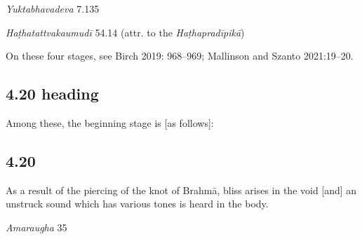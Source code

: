 \begin{ekdosis}
\begin{testimonia}[hp04_019]
\emph{Yuktabhavadeva} 7.135
\begin{versinnote}
\end{versinnote}

\emph{Haṭhatattvakaumudī} 54.14 (attr. to the \emph{Haṭhapradīpikā})
\begin{versinnote}
\end{versinnote}

\end{testimonia}

\begin{philcomm}[hp04_019]
On these four stages, see Birch 2019: 968–969; Mallinson and Szanto 2021:19–20.
\end{philcomm}

\subsection*{4.20 heading}
\begin{translation}[hp04_020a]
Among these, the beginning stage is [as follows]:
\end{translation}


\subsection*{4.20}
\begin{translation}[hp04_020]
As a result of the piercing of the knot of Brahmā, bliss arises in the void [and] an unstruck sound which has various tones is heard in the body.
\end{translation}


\begin{sources}[hp04_020]
\emph{Amaraugha} 35
\begin{versinnote}
\end{versinnote}
\end{sources}


\end{ekdosis}
